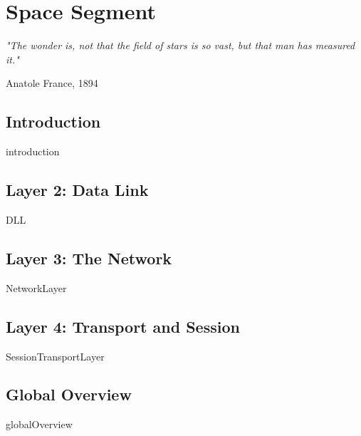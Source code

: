 \chapter{Space Segment}

%

\epigraph{\textit{"The wonder is, not that the field of stars is so vast, but that man has measured it."}}{Anatole France, 1894} 

\section{Introduction}
{introduction}

\section{Layer 2: Data Link}
{DLL}

\section{Layer 3: The Network}
{NetworkLayer}

\section{Layer 4: Transport and Session}
{SessionTransportLayer}

\section{Global Overview}
{globalOverview}
